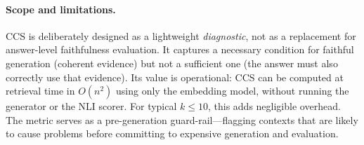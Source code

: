 \paragraph{Scope and limitations.}
CCS is deliberately designed as a lightweight \emph{diagnostic}, not as a
replacement for answer-level faithfulness evaluation. It captures a necessary
condition for faithful generation (coherent evidence) but not a sufficient
one (the answer must also correctly use that evidence). Its value is
operational: CCS can be computed at retrieval time in $O(n^2)$ using only
the embedding model, without running the generator or the NLI scorer. For
typical $k \leq 10$, this adds negligible overhead. The metric serves as a
pre-generation guard-rail---flagging contexts that are likely to cause
problems before committing to expensive generation and evaluation.
